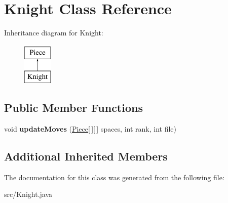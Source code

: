 \hypertarget{class_knight}{\section{Knight Class Reference}
\label{class_knight}
}
Inheritance diagram for Knight\-:\begin{figure}[H]
\begin{center}
\leavevmode
\includegraphics[height=2.000000cm]{class_knight}
\end{center}
\end{figure}
\subsection*{Public Member Functions}
\begin{DoxyCompactItemize}
\item 
\hypertarget{class_knight_aaec127931cdd68af4c0169c4ce221cc3}{void {\bfseries update\-Moves} (\hyperlink{class_piece}{Piece}\mbox{[}$\,$\mbox{]}\mbox{[}$\,$\mbox{]} spaces, int rank, int file)}\label{class_knight_aaec127931cdd68af4c0169c4ce221cc3}

\end{DoxyCompactItemize}
\subsection*{Additional Inherited Members}


The documentation for this class was generated from the following file\-:\begin{DoxyCompactItemize}
\item 
src/Knight.\-java\end{DoxyCompactItemize}
